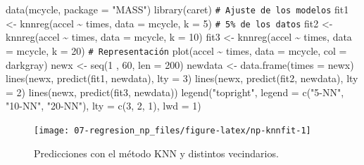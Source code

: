 \documentclass[
]{book}
\newenvironment{Shaded}{\begin{snugshade}}{\end{snugshade}}
\newcommand{\AttributeTok}[1]{\textcolor[rgb]{0.77,0.63,0.00}{#1}}
\newcommand{\CommentTok}[1]{\textcolor[rgb]{0.56,0.35,0.01}{\textit{#1}}}
\newcommand{\DecValTok}[1]{\textcolor[rgb]{0.00,0.00,0.81}{#1}}
\newcommand{\FunctionTok}[1]{\textcolor[rgb]{0.00,0.00,0.00}{#1}}
\newcommand{\NormalTok}[1]{#1}
\newcommand{\OtherTok}[1]{\textcolor[rgb]{0.56,0.35,0.01}{#1}}
\newcommand{\SpecialCharTok}[1]{\textcolor[rgb]{0.00,0.00,0.00}{#1}}
\newcommand{\StringTok}[1]{\textcolor[rgb]{0.31,0.60,0.02}{#1}}
\theoremstyle{break}
\theoremstyle{nonumberplain}
\renewcommand{\CommentTok}[1]{\textcolor[rgb]{0.41,0.41,0.41}{\texttt{#1}}}
\begin{document}
\begin{Shaded}
\begin{Highlighting}[]
\FunctionTok{data}\NormalTok{(mcycle, }\AttributeTok{package =} \StringTok{"MASS"}\NormalTok{)}
\FunctionTok{library}\NormalTok{(caret)}
\CommentTok{\# Ajuste de los modelos}
\NormalTok{fit1 }\OtherTok{\textless{}{-}} \FunctionTok{knnreg}\NormalTok{(accel }\SpecialCharTok{\textasciitilde{}}\NormalTok{ times, }\AttributeTok{data =}\NormalTok{ mcycle, }\AttributeTok{k =} \DecValTok{5}\NormalTok{) }\CommentTok{\# 5\% de los datos}
\NormalTok{fit2 }\OtherTok{\textless{}{-}} \FunctionTok{knnreg}\NormalTok{(accel }\SpecialCharTok{\textasciitilde{}}\NormalTok{ times, }\AttributeTok{data =}\NormalTok{ mcycle, }\AttributeTok{k =} \DecValTok{10}\NormalTok{)}
\NormalTok{fit3 }\OtherTok{\textless{}{-}} \FunctionTok{knnreg}\NormalTok{(accel }\SpecialCharTok{\textasciitilde{}}\NormalTok{ times, }\AttributeTok{data =}\NormalTok{ mcycle, }\AttributeTok{k =} \DecValTok{20}\NormalTok{)}
\CommentTok{\# Representación}
\FunctionTok{plot}\NormalTok{(accel }\SpecialCharTok{\textasciitilde{}}\NormalTok{ times, }\AttributeTok{data =}\NormalTok{ mcycle, }\AttributeTok{col =} \StringTok{\textquotesingle{}darkgray\textquotesingle{}}\NormalTok{) }
\NormalTok{newx }\OtherTok{\textless{}{-}} \FunctionTok{seq}\NormalTok{(}\DecValTok{1}\NormalTok{ , }\DecValTok{60}\NormalTok{, }\AttributeTok{len =} \DecValTok{200}\NormalTok{)}
\NormalTok{newdata }\OtherTok{\textless{}{-}} \FunctionTok{data.frame}\NormalTok{(}\AttributeTok{times =}\NormalTok{ newx)}
\FunctionTok{lines}\NormalTok{(newx, }\FunctionTok{predict}\NormalTok{(fit1, newdata), }\AttributeTok{lty =} \DecValTok{3}\NormalTok{)}
\FunctionTok{lines}\NormalTok{(newx, }\FunctionTok{predict}\NormalTok{(fit2, newdata), }\AttributeTok{lty =} \DecValTok{2}\NormalTok{)}
\FunctionTok{lines}\NormalTok{(newx, }\FunctionTok{predict}\NormalTok{(fit3, newdata))}
\FunctionTok{legend}\NormalTok{(}\StringTok{"topright"}\NormalTok{, }\AttributeTok{legend =} \FunctionTok{c}\NormalTok{(}\StringTok{"5{-}NN"}\NormalTok{, }\StringTok{"10{-}NN"}\NormalTok{, }\StringTok{"20{-}NN"}\NormalTok{), }
       \AttributeTok{lty =} \FunctionTok{c}\NormalTok{(}\DecValTok{3}\NormalTok{, }\DecValTok{2}\NormalTok{, }\DecValTok{1}\NormalTok{), }\AttributeTok{lwd =} \DecValTok{1}\NormalTok{)}
\end{Highlighting}
\end{Shaded}

\begin{figure}[!htb]

{\centering \texttt{[image: 07-regresion\_np\_files/figure-latex/np-knnfit-1]} 

}

\caption{Predicciones con el método KNN y distintos vecindarios.}\label{fig:np-knnfit}
\end{figure}
\end{document}
